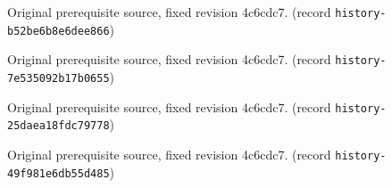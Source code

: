 \label{lag:germ-domain}
\label{lag:germ-noetherian}
\label{lag:prime-nullstellensatz}
\label{lag:regular-locus-dense}
\label{lag:regular-point-basics}
Original prerequisite source, fixed revision 4c6cdc7. (record \texttt{history-b52be6b8e6dee866})\par
\par\medskip\noindent\texttt{}\par
\label{trace:actual-manifold-finite-span-adapted-covariance}
Original prerequisite source, fixed revision 4c6cdc7. (record \texttt{history-7e535092b17b0655})\par
\par\medskip\noindent\texttt{}\par
\label{mc:centres-avoid-open}
\label{mc:coherent-germs}
\label{mc:contact-marked-canonical}
\label{mc:coordinate-derivatives}
\label{mc:embedding-properties}
\label{mc:embedding-properties-smooth-centre}
\label{mc:factorization-domain}
\label{mc:giraud-tower}
\label{mc:giraud-transform}
\label{mc:homogenized-coherent}
\label{mc:homogenized-equivalent-along}
\label{mc:inclusions}
\label{mc:monomial-local-equation}
\label{mc:nested-product-chart}
\label{mc:normal-derivative-monomial}
\label{mc:normal-taylor-order}
\label{mc:restrict-order}
\label{mc:restrict-step}
\label{mc:smooth-part-invariant}
\label{mc:strict-along}
\label{mc:tower-iso-opens}
\label{mc:tower-isomorphism-basic}
\label{mc:tower-isomorphism-restrict-append}
\label{mc:tower-isomorphism-transform}
Original prerequisite source, fixed revision 4c6cdc7. (record \texttt{history-25daea18fdc79778})\par
\par\medskip\noindent\texttt{}\par
\label{trace:actual-snc-divisor-local-monomial-generator}
Original prerequisite source, fixed revision 4c6cdc7. (record \texttt{history-49f981e6db55d485})\par
